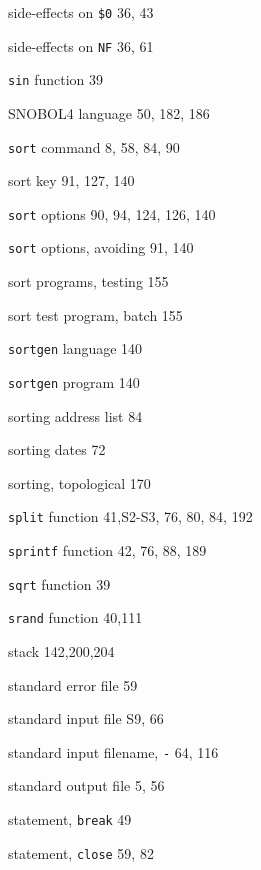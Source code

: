 \begin{multicols}{3}
\hangindent=3pc  side-effects on \verb'$0' 36, 43

\hangindent=3pc  side-effects on \verb'NF' 36, 61

\hangindent=3pc  \verb'sin' function 39

\hangindent=3pc  SNOBOL4 language 50, 182, 186

\hangindent=3pc  \verb'sort' command 8, 58, 84, 90

\hangindent=3pc  sort key 91, 127, 140

\hangindent=3pc  \verb'sort' options 90, 94, 124, 126, 140

\hangindent=3pc  \verb'sort' options, avoiding 91, 140


\hangindent=3pc  sort programs, testing 155

\hangindent=3pc  sort test program, batch 155

\hangindent=3pc  \verb'sortgen' language 140

\hangindent=3pc  \verb'sortgen' program 140

\hangindent=3pc  sorting address list 84

\hangindent=3pc  sorting dates 72

\hangindent=3pc  sorting, topological 170

\hangindent=3pc  \verb'split' function 41,S2-S3, 76, 80, 84, 192

\hangindent=3pc  \verb'sprintf' function 42, 76, 88, 189

\hangindent=3pc  \verb'sqrt' function 39

\hangindent=3pc  \verb'srand' function 40,111

\hangindent=3pc  stack 142,200,204

\hangindent=3pc  standard error file 59

\hangindent=3pc  standard input file S9, 66

\hangindent=3pc  standard input filename, \verb'-' 64, 116

\hangindent=3pc  standard output file 5, 56

\hangindent=3pc  statement, \verb'break' 49

\hangindent=3pc  statement, \verb'close' 59, 82


\end{multicols}
